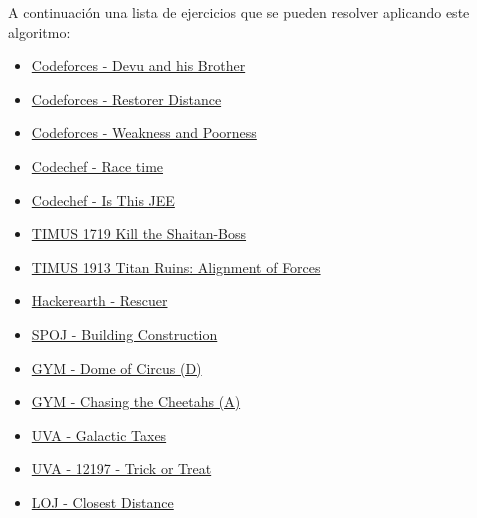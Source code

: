 A continuación una lista de ejercicios que se pueden resolver aplicando este algoritmo:

\begin{itemize}
	\item \href{https://codeforces.com/problemset/problem/439/D}{Codeforces - Devu and his Brother}
	\item \href{https://codeforces.com/contest/1355/problem/E}{Codeforces - Restorer Distance}
	\item \href{http://codeforces.com/problemset/problem/578/C}{Codeforces - Weakness and Poorness}
	\item \href{https://www.codechef.com/problems/AMCS03}{Codechef - Race time}
	\item \href{https://www.codechef.com/problems/ICM2003}{Codechef - Is This JEE }
	\item \href{https://acm.timus.ru/problem.aspx?space=1&num=1719}{TIMUS 1719 Kill the Shaitan-Boss}
	\item \href{https://acm.timus.ru/problem.aspx?space=1&num=1913}{TIMUS 1913 Titan Ruins: Alignment of Forces}
	\item \href{https://www.hackerearth.com/problem/algorithm/rescuer-2d2495cb/}{Hackerearth - Rescuer}
	\item \href{http://www.spoj.com/problems/KOPC12A/}{SPOJ - Building Construction}
	\item \href{http://codeforces.com/gym/101309}{GYM - Dome of Circus (D)}
	\item \href{http://codeforces.com/gym/100829}{GYM - Chasing the Cheetahs (A)}
	\item \href{https://uva.onlinejudge.org/index.php?option=com_onlinejudge&Itemid=8&page=show_problem&problem=4898}{UVA - Galactic Taxes}
	\item \href{https://uva.onlinejudge.org/index.php?option=com_onlinejudge&Itemid=8&page=show_problem&problem=3349}{UVA - 12197 - Trick or Treat}
	\item \href{http://lightoj.com/volume_showproblem.php?problem=1146}{LOJ - Closest Distance}
\end{itemize}